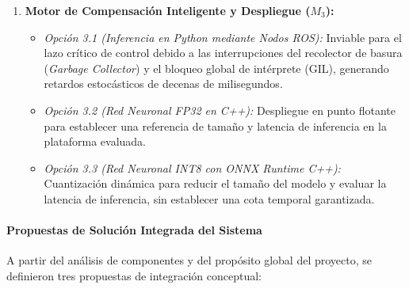 \documentclass[12pt]{article}
\begin{document}
\begin{enumerate}
\begin{itemize}
    \end{itemize}
    \item \textbf{Motor de Compensación Inteligente y Despliegue ($M_3$):}
    \begin{itemize}
        \item \textit{Opción 3.1 (Inferencia en Python mediante Nodos ROS):} Inviable para el lazo crítico de control debido a las interrupciones del recolector de basura (\textit{Garbage Collector}) y el bloqueo global de intérprete (GIL), generando retardos estocásticos de decenas de milisegundos.
        \item \textit{Opción 3.2 (Red Neuronal FP32 en C++):} Despliegue en punto flotante para establecer una referencia de tamaño y latencia de inferencia en la plataforma evaluada.
        \item \textit{Opción 3.3 (Red Neuronal INT8 con ONNX Runtime C++):} Cuantización dinámica para reducir el tamaño del modelo y evaluar la latencia de inferencia, sin establecer una cota temporal garantizada.
    \end{itemize}
\end{enumerate}

\paragraph{Propuestas de Solución Integrada del Sistema}
A partir del análisis de componentes y del propósito global del proyecto, se definieron tres propuestas de integración conceptual:
\end{document}

